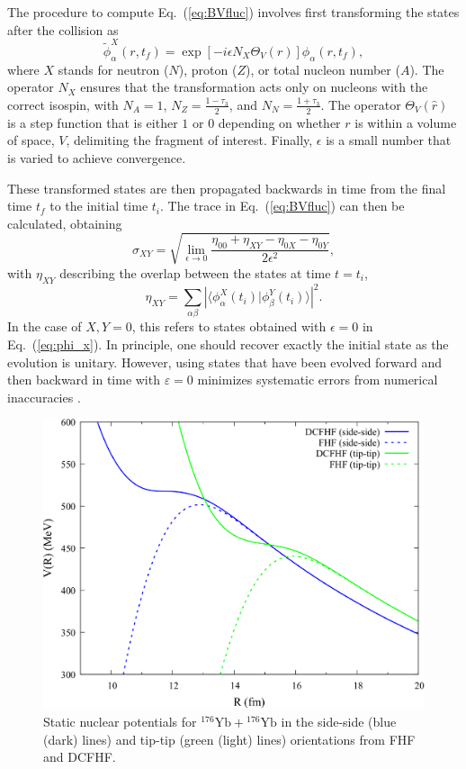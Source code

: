 The procedure to compute Eq.~(\ref{eq:BVfluc}) involves first transforming the states after the collision as
\begin{equation}
\tilde{\phi}^X_\alpha(r,t_f)=\exp[-i\epsilon N_X\Theta_V({r})]\phi_\alpha(r,t_f),\label{eq:phi_x}
\end{equation}
where $X$ stands for neutron ($N$), proton ($Z$), or total nucleon number ($A$).
The operator $N_X$ ensures that the transformation acts only on nucleons with the correct isospin, with $N_A=1$, $N_Z=\frac{1-\tau_3}{2}$, and $N_N=\frac{1+\tau_3}{2}$.  
The operator $\Theta_V(\hat{r})$ is a step function that is either $1$ or $0$ depending on whether $r$ is within a volume of space, $V$, delimiting the fragment of interest.
Finally, $\epsilon$ is a small number that is varied to achieve convergence.

These transformed states are then propagated backwards in time from the final time $t_f$ to the initial time $t_i$.
The trace in Eq.~(\ref{eq:BVfluc}) can then be calculated, obtaining
\begin{equation}\label{ybyb:eq:sigma}
\sigma_{XY} = \sqrt{\lim_{\epsilon\rightarrow0}\frac{\eta_{00}+\eta_{XY}-\eta_{0X}-\eta_{0Y}}{2\epsilon^2}},
\end{equation}
with $\eta_{XY}$ describing the overlap between the states at  time $t=t_i$,
\begin{equation}
\eta_{XY}=\sum_{\alpha \beta}\left|\langle\phi_\alpha^X(t_i)|\phi_\beta^Y(t_i)\rangle\right|^2.
\end{equation}
In the case of $X,Y=0$, this refers to states obtained with $\epsilon=0$ in Eq.~(\ref{eq:phi_x}).
In principle, one should recover exactly the initial state as the evolution is unitary.
However, using states that have been evolved forward and then backward in time with $\varepsilon=0$ minimizes systematic errors from numerical inaccuracies \citep{bonche1985,broomfield2009}. 

\begin{figure}
	\includegraphics*[width=\textwidth]{../Figures/YbYb/Potentials.pdf}
	\caption{Static nuclear potentials for $^{176}\mathrm{Yb}+{}^{176}\mathrm{Yb}$ in the side-side (blue (dark) lines) and tip-tip (green (light) lines) orientations from FHF and DCFHF.}
	\label{fig:pot}
\end{figure}

